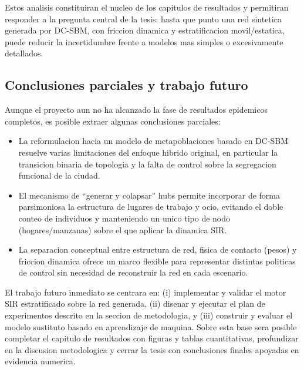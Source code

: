 Estos analisis constituiran el nucleo de los capitulos de resultados y permitiran responder a la pregunta central de la tesis: hasta que punto una red sintetica generada por DC-SBM, con friccion dinamica y estratificacion movil/estatica, puede reducir la incertidumbre frente a modelos mas simples o excesivamente detallados.

\subsection{Conclusiones parciales y trabajo futuro}

Aunque el proyecto aun no ha alcanzado la fase de resultados epidemicos completos, es posible extraer algunas conclusiones parciales:

\begin{itemize}
    \item La reformulacion hacia un modelo de metapoblaciones basado en DC-SBM resuelve varias limitaciones del enfoque hibrido original, en particular la transicion binaria de topologia y la falta de control sobre la segregacion funcional de la ciudad.
    \item El mecanismo de “generar y colapsar” hubs permite incorporar de forma parsimoniosa la estructura de lugares de trabajo y ocio, evitando el doble conteo de individuos y manteniendo un unico tipo de nodo (hogares/manzanas) sobre el que aplicar la dinamica SIR.
    \item La separacion conceptual entre estructura de red, fisica de contacto (pesos) y friccion dinamica ofrece un marco flexible para representar distintas politicas de control sin necesidad de reconstruir la red en cada escenario.
\end{itemize}

El trabajo futuro inmediato se centrara en: (i) implementar y validar el motor SIR estratificado sobre la red generada, (ii) disenar y ejecutar el plan de experimentos descrito en la seccion de metodologia, y (iii) construir y evaluar el modelo sustituto basado en aprendizaje de maquina. Sobre esta base sera posible completar el capitulo de resultados con figuras y tablas cuantitativas, profundizar en la discusion metodologica y cerrar la tesis con conclusiones finales apoyadas en evidencia numerica.


